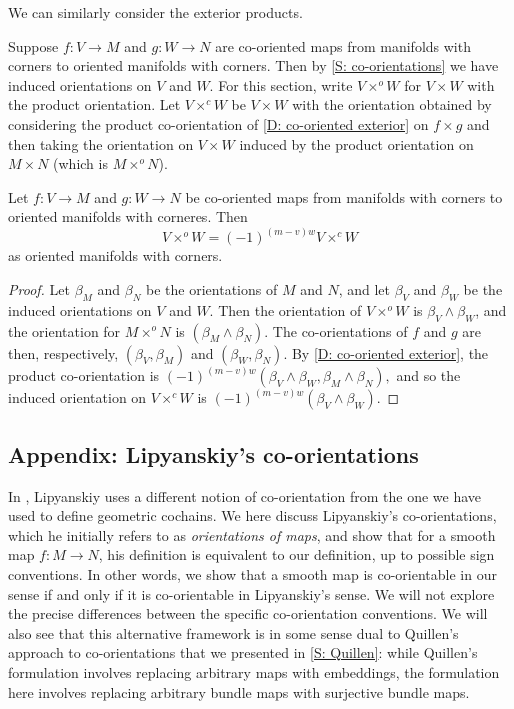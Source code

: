 We can similarly consider the exterior products.

Suppose $f \colon V \to M$ and $g \colon W \to N$ are co-oriented maps from manifolds with corners to oriented manifolds with corners.
Then by \cref{S: co-orientations} we have induced orientations on $V$ and $W$.
For this section, write $V \times^o W$ for $V \times W$ with the product orientation.
Let $V \times^c W$ be $V \times W$ with the orientation obtained by considering the product co-orientation of \cref{D: co-oriented exterior} on $f \times g$ and then taking the orientation on $V \times W$ induced by the product orientation on $M \times N$ (which is $M \times^o N$).



\begin{proposition}\label{P: compare exterior orientations}
	Let $f \colon V \to M$ and $g \colon W \to N$ be co-oriented maps from manifolds with corners to oriented manifolds with corneres.
	Then $$V \times^o W = (-1)^{(m-v)w} V \times^c W$$ as oriented manifolds with corners.
\end{proposition}
\begin{proof}
Let $\beta_M$ and $\beta_N$ be the orientations of $M$ and $N$, and let $\beta_V$ and $\beta_W$ be the induced orientations on $V$ and $W$.
Then the orientation of $V \times^o W$ is $\beta_V \wedge \beta_W$, and the orientation for $M \times^o N$ is $(\beta_M \wedge \beta_N)$.
The co-orientations of $f$ and $g$ are then, respectively, $(\beta_V, \beta_M)$ and $(\beta_W, \beta_N)$.
By \cref{D: co-oriented exterior}, the product co-orientation is $(-1)^{(m-v)w}(\beta_V \wedge \beta_W,\beta_M \wedge \beta_N),$ and so the induced orientation on $V \times^c W$ is $(-1)^{(m-v)w}(\beta_V \wedge \beta_W)$.
\end{proof}




\subsection{Appendix: Lipyanskiy's co-orientations}\label{S: Lipyanskiy co-orientations}

In \cite{Lipy14}, Lipyanskiy uses a different notion of co-orientation from the one we have used to define geometric cochains.
We here discuss Lipyanskiy's co-orientations, which he initially refers to as \textit{orientations of maps}, and show that for a smooth map $f \colon M \to N$, his definition is equivalent to our definition, up to possible sign conventions.
In other words, we show that a smooth map is co-orientable in our sense if and only if it is co-orientable in Lipyanskiy's sense.
We will not explore the precise differences between the specific co-orientation conventions.
We will also see that this alternative framework is in some sense dual to Quillen's approach to co-orientations that we presented in \cref{S: Quillen}: while Quillen's formulation involves replacing arbitrary maps with embeddings, the formulation here involves replacing arbitrary bundle maps with surjective bundle maps.

